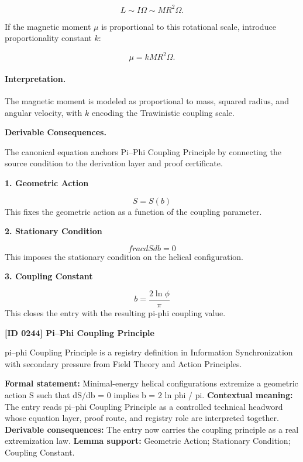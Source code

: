 \begin{equation}
L
\sim
I\Omega
\sim
MR^2\Omega .
\end{equation}

If the magnetic moment $\mu$ is proportional to this rotational scale, introduce proportionality constant $k$:

\begin{equation}
\boxed{
\mu
=
kMR^2\Omega .
}
\end{equation}

\paragraph{Interpretation.}
The magnetic moment is modeled as proportional to mass, squared radius, and angular velocity, with $k$ encoding the Trawinistic coupling scale.

\par\vspace{0.35em}
\noindent\textbf{Derivable Consequences.}\quad
\begingroup
\footnotesize
\raggedright
The canonical equation anchors Pi--Phi Coupling Principle by connecting the source condition to the derivation layer and proof certificate.
\par\endgroup

\noindent\textbf{1. Geometric Action}\par
\[
S = S(b)
\]
\noindent This fixes the geometric action as a function of the coupling parameter.\par
\noindent\textbf{2. Stationary Condition}\par
\[
frac{dS}{db}=0
\]
\noindent This imposes the stationary condition on the helical configuration.\par
\noindent\textbf{3. Coupling Constant}\par
\[
b = \frac{2\ln \phi}{\pi}
\]
\noindent This closes the entry with the resulting pi-phi coupling value.\par

\clearpage
\noindent\textbf{[ID 0244] Pi--Phi Coupling Principle}\par
\vspace{0.35em}
\begingroup\small
{}
pi--phi Coupling Principle is a registry definition in Information Synchronization with secondary pressure from Field Theory and Action Principles.

\begingroup\footnotesize\setlength{\emergencystretch}{3em}\sloppy
\textbf{Formal statement:} Minimal-energy helical configurations extremize a geometric action S such that dS/db = 0 implies b = 2 ln phi / pi. \textbf{Contextual meaning:} The entry reads pi--phi Coupling Principle as a controlled technical headword whose equation layer, proof route, and registry role are interpreted together. \textbf{Derivable consequences:} The entry now carries the coupling principle as a real extremization law. \textbf{Lemma support:} Geometric Action; Stationary Condition; Coupling Constant.\par
\endgroup

